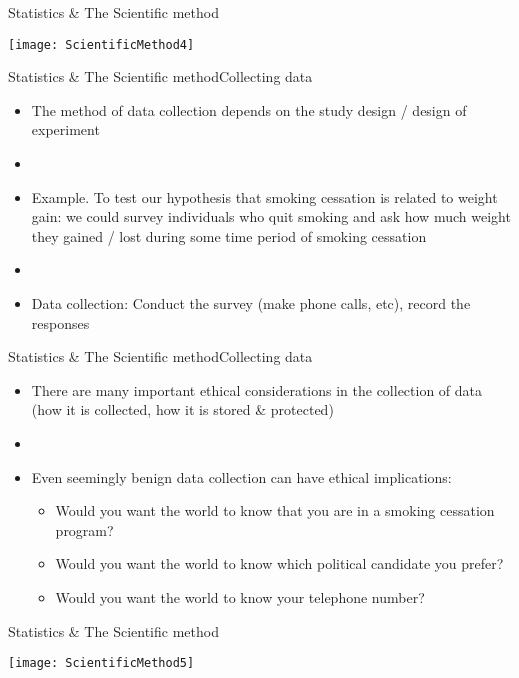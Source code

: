\documentclass[xcolor=dvipsnames]{beamer}
\begin{document}
\begin{frame}{Statistics \& The Scientific method}
	\vspace{-12pt}
	\begin{center}
		\texttt{[image: ScientificMethod4]}
	\end{center}
\end{frame}

\begin{frame}{Statistics \& The Scientific method}{Collecting data}
	\begin{itemize}
		\item The method of data collection depends on the study design / design of experiment \pause
		\item[]
		\item Example. To test our hypothesis that smoking cessation is related to weight gain: we could survey individuals who quit smoking and ask how much weight they gained / lost during some time period of smoking cessation \pause
		\item[]
		\item Data collection: Conduct the survey (make phone calls, etc), record the responses
	\end{itemize}
\end{frame}

\begin{frame}{Statistics \& The Scientific method}{Collecting data}
	\begin{itemize}
		\item There are many important ethical considerations in the collection of data (how it is collected, how it is stored \& protected) \pause
		\item[]
		\item Even seemingly benign data collection can have ethical implications: \pause
		\begin{itemize}
			\item Would you want the world to know that you are in a smoking cessation program? \pause
			\item Would you want the world to know which political candidate you prefer? \pause
			\item Would you want the world to know your telephone number?
		\end{itemize}
	\end{itemize}
\end{frame}

\begin{frame}{Statistics \& The Scientific method}
	\vspace{-12pt}
	\begin{center}
		\texttt{[image: ScientificMethod5]}
	\end{center}
\end{frame}
\end{document}
